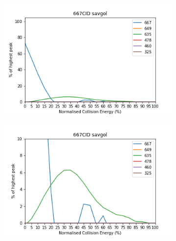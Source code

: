 \begin{figure}[!htbp]
  \begin{subfigure}[b]{0.5\textwidth}
    \includegraphics[width=\textwidth]{content/Anhang/MSLeafspray/RP_667/667CID-667savgol.png}
    \caption{}
  \end{subfigure}
  \hfill
  \begin{subfigure}[b]{0.5\textwidth}
    \includegraphics[width=\textwidth]{content/Anhang/MSLeafspray/RP_667/667CID-667savgolv10.png}
    \caption{}
  \end{subfigure}
  

\end{figure}
